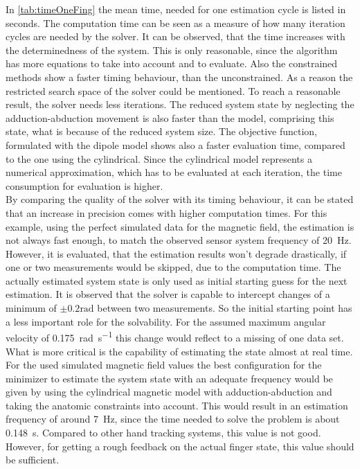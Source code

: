 In \ref{tab:timeOneFing} the mean time, needed for one estimation cycle is listed in seconds. The computation time can be seen as a measure of how many iteration cycles are needed by the solver. It can be observed, that the time increases with the determinedness of the system. This is only reasonable, since the algorithm has more equations to take into account and to evaluate. Also the constrained methods show a faster timing behaviour, than the unconstrained. As a reason the restricted search space of the solver could be mentioned. To reach a reasonable result, the solver needs less iterations. The reduced system state by neglecting the adduction-abduction movement is also faster than the model, comprising this state, what is because of the reduced system size. The objective function, formulated with the dipole model shows also a faster evaluation time, compared to the one using the cylindrical. Since the cylindrical model represents a numerical approximation, which has to be evaluated at each iteration, the time consumption for evaluation is higher.\\
By comparing the quality of the solver with its timing behaviour, it can be stated that an increase in precision comes with higher computation times. For this example, using the perfect simulated data for the magnetic field, the estimation is not always fast enough, to match the observed sensor system frequency of \SI{20}{\Hz}. However, it is evaluated, that the estimation results won't degrade drastically, if one or two measurements would be skipped, due to the computation time. The actually estimated system state is only used as initial starting guess for the next estimation. It is observed that the solver is capable to intercept changes of a minimum of $ \pm 0.2 \si{\radian} $ between two measurements. So the initial starting point has a less important role for the solvability. For the assumed maximum angular velocity of \SI[per-mode=symbol]{0.175}{\radian \per \second} this change would reflect to a missing of one data set. What is more critical is the capability of estimating the state almost at real time. For the used simulated magnetic field values the best configuration for the minimizer to estimate the system state with an adequate frequency would be given by using the cylindrical magnetic model with adduction-abduction and taking the anatomic constraints into account. This would result in an estimation frequency of around \SI{7}{\Hz}, since the time needed to solve the problem is about \SI{0.148}{\second}. Compared to other hand tracking systems, this value is not good. However, for getting a rough feedback on the actual finger state, this value should be sufficient.
